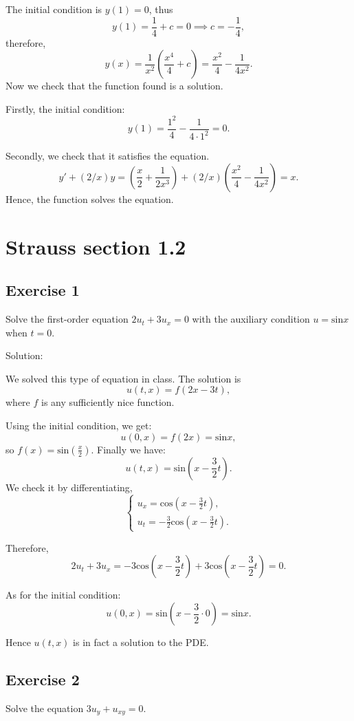 \documentclass{article}
\begin{document}
		The initial condition is $y(1)=0$, thus \[ y(1)=\frac{1}{4} + c= 0 \implies c=-\frac{1}{4},\]
		therefore,
		\[y(x) = \frac{1}{x^2}\left(\frac{x^4}{4}+c\right) = \frac{x^2}{4} - \frac{1}{4x^2}.\]
		Now we check that the function found is a solution.

		Firstly, the initial condition:
		\[y(1)= \frac{1^2}{4} - \frac{1}{4\cdot 1^2} =0.\]

		Secondly, we check that it satisfies the equation.
		\[y'+(2/x)y = \left(\frac{x}{2} + \frac{1}{2x^3}\right) +(2/x)\left(\frac{x^2}{4} - \frac{1}{4x^2}\right) = x.\]
		Hence, the function solves the equation.

\section{Strauss section 1.2}
\subsection{Exercise 1}
			Solve the first-order equation
			$2u_t +3u_ x =0$ with the auxiliary condition $u=\text{sin}x$ when $t=0.$

			Solution:

			We solved this type of equation in class.
			The solution is 
			\[ u(t,x)=f(2x-3t),\]
			where $f$ is any sufficiently nice function.

			Using the initial condition, we get:
			\[u(0,x)=f(2x)=\text{sin}x,\]
			so $f(x)=\text{sin}\left(\frac{x}{2}\right)$.
			Finally we have:
			\[u(t,x)=\text{sin}\left(x-\frac{3}{2}t\right).\]
			We check it by differentiating,
			\begin{equation*}
				\begin{cases}
					u_x=\text{cos}\left(x-\frac{3}{2}t\right),
					\\
					u_t=-\frac{3}{2}\text{cos}\left(x-\frac{3}{2}t\right).
				\end{cases}
			\end{equation*}

			Therefore,
			\[ 2u_t +3u_x=-3\text{cos}\left(x-\frac{3}{2}t\right) + 3\text{cos}\left(x-\frac{3}{2}t\right)=0.\]

			As for the initial condition:
			\[u(0,x)=\text{sin}\left(x-\frac{3}{2}\cdot0\right)=\text{sin}x.\]

			Hence $u(t,x)$ is in fact a solution to the PDE.

		\subsection{Exercise 2}
		Solve the equation $3u_y + u_{xy} =0.$
\end{document}
